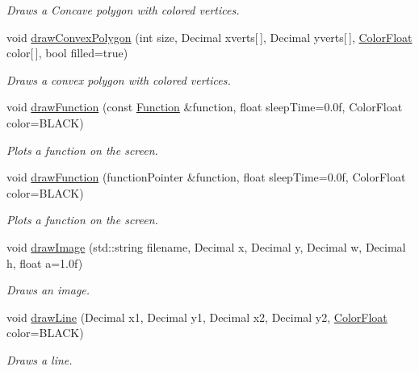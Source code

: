 \begin{DoxyCompactItemize}
\begin{DoxyCompactList}\small\item\em \-Draws a \-Concave polygon with colored vertices. \end{DoxyCompactList}\item 
void \hyperlink{classtsgl_1_1_cartesian_canvas_abefc7f373711cdff2477d0665b37212f}{draw\-Convex\-Polygon} (int size, \-Decimal xverts\mbox{[}$\,$\mbox{]}, \-Decimal yverts\mbox{[}$\,$\mbox{]}, \hyperlink{structtsgl_1_1_color_float}{\-Color\-Float} color\mbox{[}$\,$\mbox{]}, bool filled=true)
\begin{DoxyCompactList}\small\item\em \-Draws a convex polygon with colored vertices. \end{DoxyCompactList}\item 
void \hyperlink{classtsgl_1_1_cartesian_canvas_aa8c215b817d95e3e05ff26f835470c41}{draw\-Function} (const \hyperlink{classtsgl_1_1_function}{\-Function} \&function, float sleep\-Time=0.\-0f, Color\-Float color=\-B\-L\-A\-C\-K)
\begin{DoxyCompactList}\small\item\em \-Plots a function on the screen. \end{DoxyCompactList}\item 
void \hyperlink{classtsgl_1_1_cartesian_canvas_acf5536fbf6dca6df1fec719e13630a02}{draw\-Function} (function\-Pointer \&function, float sleep\-Time=0.\-0f, Color\-Float color=\-B\-L\-A\-C\-K)
\begin{DoxyCompactList}\small\item\em \-Plots a function on the screen. \end{DoxyCompactList}\item 
void \hyperlink{classtsgl_1_1_cartesian_canvas_ab2f3e7633f4f05711083eba01b0a3f4e}{draw\-Image} (std\-::string filename, \-Decimal x, \-Decimal y, \-Decimal w, \-Decimal h, float a=1.\-0f)
\begin{DoxyCompactList}\small\item\em \-Draws an image. \end{DoxyCompactList}\item 
void \hyperlink{classtsgl_1_1_cartesian_canvas_ace015a630f1ff280b2ecd6a864cdc5e2}{draw\-Line} (\-Decimal x1, \-Decimal y1, \-Decimal x2, \-Decimal y2, \hyperlink{structtsgl_1_1_color_float}{\-Color\-Float} color=\-B\-L\-A\-C\-K)
\begin{DoxyCompactList}\small\item\em \-Draws a line. \end{DoxyCompactList}\item 

\end{DoxyCompactItemize}
